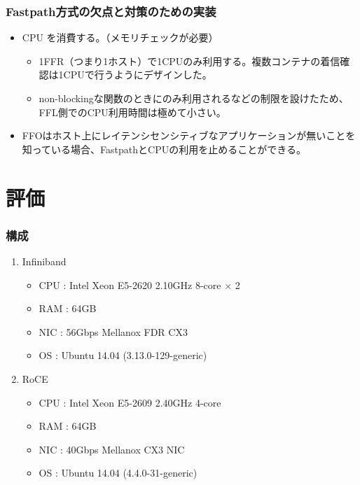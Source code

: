 \documentclass[dvipdfmx,9pt,notheorems]{beamer}
\theoremstyle{definition}
\begin{document}
\begin{frame}\frametitle{Fastpath方式の欠点と対策のための実装}
	\begin{itemize}
		\item CPU を消費する。（メモリチェックが必要）
		\begin{itemize}
			\item 1FFR（つまり1ホスト）で1CPUのみ利用する。複数コンテナの着信確認は1CPUで行うようにデザインした。
			\item non-blockingな関数のときにのみ利用されるなどの制限を設けたため、FFL側でのCPU利用時間は極めて小さい。
		\end{itemize}
		\item FFOはホスト上にレイテンシセンシティブなアプリケーションが無いことを知っている場合、FastpathとCPUの利用を止めることができる。
	\end{itemize}
\end{frame}

\section{評価}
\begin{frame}\frametitle{構成}
	\begin{enumerate}
		\item Infiniband
		\begin{itemize}
			\item CPU : Intel Xeon E5-2620 2.10GHz 8-core $\times$ 2
			\item RAM : 64GB
			\item NIC : 56Gbps Mellanox FDR CX3
			\item OS  : Ubuntu 14.04 (3.13.0-129-generic)
		\end{itemize}
		\item RoCE
		\begin{itemize}
			\item CPU : Intel Xeon E5-2609 2.40GHz 4-core
			\item RAM : 64GB
			\item NIC : 40Gbps Mellanox CX3 NIC
			\item OS  : Ubuntu 14.04 (4.4.0-31-generic)
		\end{itemize}
	\end{enumerate}
\end{frame}
\end{document}

